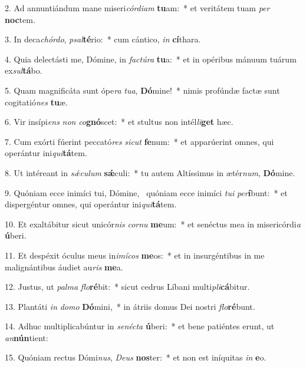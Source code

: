 2. Ad annuntiándum mane miseri\textit{cór}\textit{di}\textit{am} \textbf{tu}am:~*  et veritátem tuam \textit{per} \textbf{noc}tem.\

3. In deca\textit{chór}\textit{do}, \textit{psal}\textbf{té}rio:~*  cum cántico, \textit{in} \textbf{cí}thara.\

4. Quia delectásti me, Dómine, in \textit{fac}\textit{tú}\textit{ra} \textbf{tu}a:~*  et in opéribus mánuum tuárum ex\textit{sul}\textbf{tá}bo.\

5. Quam magnificáta sunt ópe\textit{ra} \textit{tu}\textit{a}, \textbf{Dó}mine!~*  nimis profúndæ factæ sunt cogitatió\textit{nes} \textbf{tu}æ.\

6. Vir insípi\textit{ens} \textit{non} \textit{co}\textbf{gnó}scet:~*  et stultus non intél\textit{li}\textbf{get} hæc.\

7. Cum exórti fúerint peccató\textit{res} \textit{sic}\textit{ut} \textbf{fe}num:~*  et apparúerint omnes, qui operántur ini\textit{qui}\textbf{tá}tem.\

8. Ut intéreant in \textit{sǽ}\textit{cu}\textit{lum} \textbf{sǽ}culi:~*  tu autem Altíssimus in ætér\textit{num}, \textbf{Dó}mine.\

9. Quóniam ecce inimíci tui, Dómine, \dag\  quóniam ecce inimíci \textit{tu}\textit{i} \textit{per}\textbf{í}bunt:~*  et dispergéntur omnes, qui operántur ini\textit{qui}\textbf{tá}tem.\

10. Et exaltábitur sicut unicór\textit{nis} \textit{cor}\textit{nu} \textbf{me}um:~*  et senéctus mea in misericórdi\textit{a} \textbf{ú}beri.\

11. Et despéxit óculus meus in\textit{i}\textit{mí}\textit{cos} \textbf{me}os:~*  et in insurgéntibus in me malignántibus áudiet au\textit{ris} \textbf{me}a.\

12. Justus, ut \textit{pal}\textit{ma} \textit{flo}\textbf{ré}bit:~*  sicut cedrus Líbani multi\textit{pli}\textbf{cá}bitur.\

13. Plantáti \textit{in} \textit{do}\textit{mo} \textbf{Dó}mini,~*  in átriis domus Dei nostri \textit{flo}\textbf{ré}bunt.\

14. Adhuc multiplicabúntur in \textit{se}\textit{néc}\textit{ta} \textbf{ú}beri:~*  et bene patiéntes erunt, ut \textit{an}\textbf{nún}tient:\

15. Quóniam rectus Dómi\textit{nus}, \textit{De}\textit{us} \textbf{nos}ter:~*  et non est iníquitas \textit{in} \textbf{e}o.\

